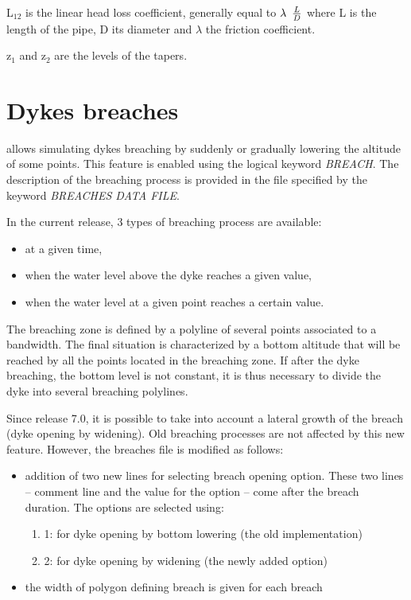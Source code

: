  L${}_{12}$ is the linear head loss coefficient, generally equal to $\lambda {\kern 1pt} {\kern 1pt} {\kern 1pt} {\kern 1pt} {\kern 1pt} \frac{L}{D} $ where L is the length of the pipe, D its diameter and $\lambda$ the friction coefficient.

 z${}_{1}$ and z${}_{2}$ are the levels of the tapers.


\section{ Dykes breaches}
\label{sec:dykes}
  allows simulating dykes breaching by suddenly or gradually lowering the altitude of some points. This feature is enabled using the logical keyword \textit{BREACH}. The description of the breaching process is provided in the file specified by the keyword \textit{BREACHES DATA FILE}.

 In the current release, 3 types of breaching process are available:

\begin{itemize}
\item  at a given time,

\item  when the water level above the dyke reaches a given value,

\item  when the water level at a given point reaches a certain value.
\end{itemize}

 The breaching zone is defined by a polyline of several points associated to a bandwidth. The final situation is characterized by a bottom altitude that will be reached by all the points located in the breaching zone. If after the dyke breaching, the bottom level is not constant, it is thus necessary to divide the dyke into several breaching polylines.

 Since release 7.0, it is possible to take into account a lateral growth of the breach (dyke opening by widening). Old breaching processes are not affected by this new feature. However, the breaches file is modified as follows:

\begin{itemize}
\item  addition of two new lines for selecting breach opening option. These two lines -- comment line and the value for the option -- come after the breach duration. The options are selected using:
\begin{enumerate}
\item [\nonumber] 1: for dyke opening by bottom lowering (the old implementation)

\item [\nonumber] 2: for dyke opening by widening (the newly added option)

\end{enumerate}
\item  the width of polygon defining breach is given for each breach
\end{itemize}

